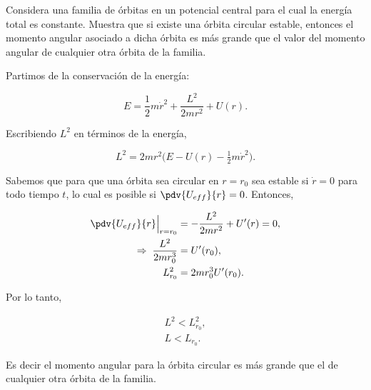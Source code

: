 \documentclass[../main.tex]{subfiles}
\begin{document}
\begin{problema}
	Considera una familia de órbitas en un potencial central
	para el cual la energía total es constante. Muestra que si
	existe una órbita circular estable, entonces el momento angular
	asociado a dicha órbita es más grande que el valor del momento
	angular de cualquier otra órbita de la familia.
\end{problema}

\startsolution

Partimos de la conservación de la energía:

\begin{equation*}
	E = \dfrac{1}{2}m \dot{r}^{2} + \dfrac{L^{2}}{2mr^{2}} + U(r).
\end{equation*}

Escribiendo \(L^{2}\) en términos de la energía,

\begin{equation*}
	L^{2} = 2mr^{2}\Biggl(E - U(r) - \tfrac{1}{2}m \dot{r}^{2}\Biggr).
\end{equation*}

Sabemos que para que una órbita sea circular en \(r = r_{0}\)
sea estable si \(\dot{r} = 0\) para todo tiempo \(t\),
lo cual es posible si \(\pdv{U_{eff}}{r} = 0\). Entonces,

\begin{align*}
	\Bigl. \pdv{U_{eff}}{r}\Bigr\rvert_{r = r_{0}} & = -\dfrac{L^{2}}{2mr^{2}} + U^{\prime}(r) = 0 , \\
	\Rightarrow\; \dfrac{L^{2}}{2mr_{0}^{3}}       & = U^{\prime}(r_{0}),                            \\
	L_{r_{0}}^{2}                                  & = 2mr_{0}^{3}U^{\prime}(r_{0}).
\end{align*}

Por lo tanto,

\begin{align*}
	L^{2} < L_{r_{0}}^{2}, \\
	L < L_{r_{0}}.
\end{align*}

Es decir el momento angular para la órbita circular es más
grande que el de cualquier otra órbita de la familia.
\end{document}
